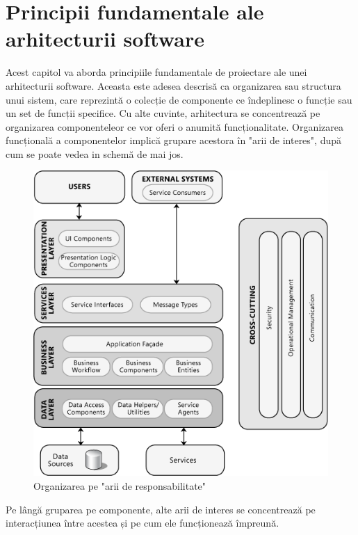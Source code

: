 \documentclass[12pt, a4paper, oneside, romanian]{teza-upb}
\begin{document}
\chapter{Principii fundamentale ale arhitecturii software}
Acest capitol va aborda principiile fundamentale de proiectare ale unei arhitecturii software. Aceasta este adesea descrisă ca organizarea sau structura unui sistem, care reprezintă o colecție de componente ce îndeplinesc o funcție sau un set de funcții specifice. Cu alte cuvinte, arhitectura se concentrează pe organizarea componenteleor ce vor oferi o anumită funcționalitate. Organizarea funcțională a componentelor implică grupare acestora în "arii de interes", după cum se poate vedea in schemă de mai jos.

\begin{figure}[ht]
\centering
\includegraphics*[scale=0.5]{img/IC351032.png}
\caption{Organizarea pe "arii de responsabilitate"}
\label{fig:arii_de_int}
\end{figure}

Pe lângă gruparea pe componente, alte arii de interes se concentrează pe interacțiunea între acestea și pe cum ele funcționează împreună. 
\newpage
\end{document}
